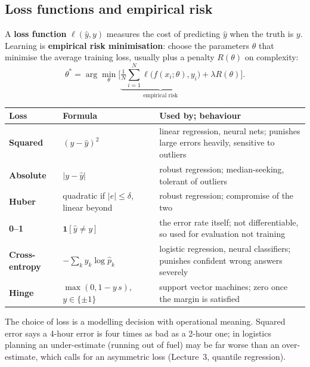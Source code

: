 \documentclass[11pt]{article}
\begin{document}
\subsection{Loss functions and empirical risk}
A \textbf{loss function} $\ell(\hat y,y)$ measures the cost of predicting $\hat y$ when the truth is $y$. Learning is \textbf{empirical risk minimisation}: choose the parameters $\theta$ that minimise the average training loss, usually plus a penalty $R(\theta)$ on complexity:
\[\theta^*=\arg\min_\theta\Big[\underbrace{\tfrac1N\textstyle\sum_{i=1}^N\ell\big(f(x_i;\theta),y_i\big)}_{\text{empirical risk}}+\lambda R(\theta)\Big].\]
\begin{center}\small\renewcommand{\arraystretch}{1.35}
\begin{tabularx}{\textwidth}{>{\bfseries}l l X}\toprule Loss & Formula & Used by; behaviour\\\midrule
Squared & $(y-\hat y)^2$ & linear regression, neural nets; punishes large errors heavily, sensitive to outliers\\
Absolute & $|y-\hat y|$ & robust regression; median-seeking, tolerant of outliers\\
Huber & quadratic if $|e|\le\delta$, linear beyond & robust regression; compromise of the two\\
0--1 & $\mathbf 1[\hat y\ne y]$ & the error rate itself; not differentiable, so used for evaluation not training\\
Cross-entropy & $-\sum_ky_k\log\hat p_k$ & logistic regression, neural classifiers; punishes confident wrong answers severely\\
Hinge & $\max(0,1-y\,s)$, $y\in\{\pm1\}$ & support vector machines; zero once the margin is satisfied\\\bottomrule
\end{tabularx}\end{center}
The choice of loss is a modelling decision with operational meaning. Squared error says a 4-hour error is four times as bad as a 2-hour one; in logistics planning an under-estimate (running out of fuel) may be far worse than an over-estimate, which calls for an asymmetric loss (Lecture~3, quantile regression).
\end{document}
